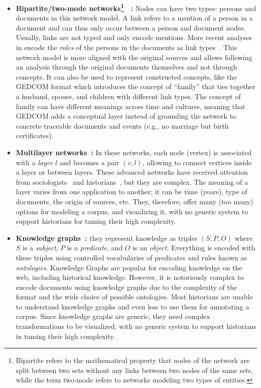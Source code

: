\begin{itemize}[nosep,leftmargin=*]
    \item \textbf{Bipartite/two-mode networks\footnote{Bipartite refers to the mathematical property that nodes of the network are split between two sets without any links between two nodes of the same sets, while the term two-mode refers to networks modeling two types of entities.}~\cite{hambergerScanningPatternsRelationship2014}
    :} Nodes can have two types: persons and documents in this network model. A link refers to a mention of a person in a document and can thus only occur between a person and document nodes. Usually, links are not typed and only encode mentions.
    More recent analyses in \hsna encode the \emph{roles} of the persons in the documents as link types~\cite{Cristofoli2018}. This network model is more aligned with the original sources and allows following an analysis through the original documents themselves and not through concepts. It can also be used to represent constructed concepts, like the GEDCOM format which introduces the concept of ``family'' that ties together a husband, spouse, and children with different link types.
    The concept of family can have different meanings across time and cultures, meaning that GEDCOM adds a conceptual layer instead of grounding the network to concrete traceable documents and events (e.g., no marriage but birth certificates).
    \item \textbf{Multilayer networks~\cite{multilayer}: } In these networks, each node (vertex) is associated with a \emph{layer} $l$ and becomes a pair $(v, l)$, allowing to connect vertices inside a layer or between layers. These advanced networks have received attention from sociologists~\cite{CRNOVRSANIN201456} and historians~\cite{vanVugt_2017}, but they are complex. The meaning of a layer varies from one application to another; it can be time (years), type of documents, the origin of sources, etc. They, therefore, offer many (too many) options for modeling a corpus, and visualizing it, with no generic system to support historians for taming their high complexity.
    \item \textbf{Knowledge graphs~\cite{hoganKnowledgeGraphs2021}: } they represent knowledge as triples $(S, P, O)$ where $S$ is a \emph{subject}, $P$ is a \emph{predicate}, and $O$ is an \emph{object}. Everything is encoded with these triples using controlled vocabularies of predicates and rules known as \emph{ontologies}. Knowledge Graphs are popular for encoding knowledge on the web, including historical knowledge. However, it is notoriously complex to encode documents using knowledge graphs due to the complexity of the format and the wide choice of possible ontologies. Most historians are unable to understand knowledge graphs and even less to use them for annotating a corpus. Since knowledge graphs are generic, they need complex transformations to be visualized, with no generic system to support historians in taming their high complexity.
\end{itemize}


